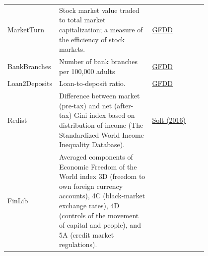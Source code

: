 \begin{refsection}
\begin{subappendices}
\begin{center}
\begin{longtable}{l p{0.50\linewidth} p{0.3\linewidth}}
  MarketTurn & Stock market value traded to total market capitalization; a measure of the efficiency of stock markets. & \href{http://data.worldbank.org/data-catalog/global-financial-development}{GFDD} \\
  BankBranches & Number of bank branches per 100,000 adults & \href{http://data.worldbank.org/data-catalog/global-financial-development}{GFDD} \\
  Loan2Deposits & Loan-to-deposit ratio. & \href{http://data.worldbank.org/data-catalog/global-financial-development}{GFDD} \\
  Redist & Difference between market (pre-tax) and net (after-tax) Gini index based on distribution of income  (The Standardized World Income Inequality Database). & \href{http://fsolt.org/swiid/}{Solt (2016)} \\	
  FinLib & Averaged components of Economic Freedom of the World index 3D (freedom to own foreign currency accounts), 4C (black-market exchange rates), 4D (controls of the movement of capital and people), and 5A (credit market regulations). & \href{https://www.fraserinstitute.org/economic-freedom/dataset}{\textcite{gwartney2017}} \\
  \bottomrule
\end{longtable}
\end{center}

\end{subappendices}
\end{refsection}